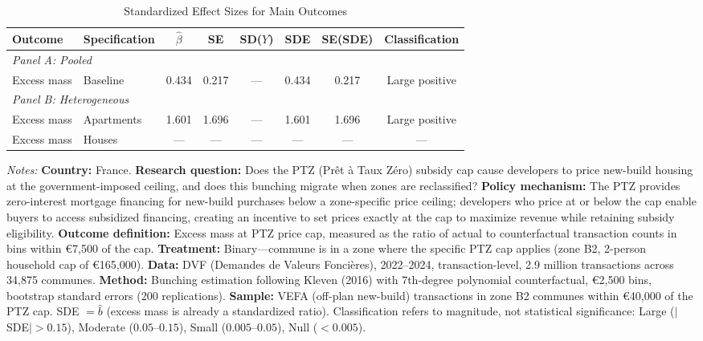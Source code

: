 \begin{table}[H]
\centering
\caption{Standardized Effect Sizes for Main Outcomes}
\label{tab:sde}
\begin{tabular}{llcccccc}
\toprule
Outcome & Specification & $\hat{\beta}$ & SE & SD($Y$) & SDE & SE(SDE) & Classification \\
\midrule
\multicolumn{8}{l}{\textit{Panel A: Pooled}} \\
Excess mass & Baseline & 0.434 & 0.217 & --- & 0.434 & 0.217 & Large positive \\
\midrule
\multicolumn{8}{l}{\textit{Panel B: Heterogeneous}} \\
Excess mass & Apartments & 1.601 & 1.696 & --- & 1.601 & 1.696 & Large positive \\
Excess mass & Houses & --- & --- & --- & --- & --- & --- \\
\bottomrule
\end{tabular}
\par\vspace{0.3em}
{\footnotesize \item \textit{Notes:} \textbf{Country:} France. \textbf{Research question:} Does the PTZ (Pr\^{e}t \`{a} Taux Z\'{e}ro) subsidy cap cause developers to price new-build housing at the government-imposed ceiling, and does this bunching migrate when zones are reclassified? \textbf{Policy mechanism:} The PTZ provides zero-interest mortgage financing for new-build purchases below a zone-specific price ceiling; developers who price at or below the cap enable buyers to access subsidized financing, creating an incentive to set prices exactly at the cap to maximize revenue while retaining subsidy eligibility. \textbf{Outcome definition:} Excess mass at PTZ price cap, measured as the ratio of actual to counterfactual transaction counts in bins within \euro7,500 of the cap. \textbf{Treatment:} Binary---commune is in a zone where the specific PTZ cap applies (zone B2, 2-person household cap of \euro165,000). \textbf{Data:} DVF (Demandes de Valeurs Fonci\`{e}res), 2022--2024, transaction-level, 2.9 million transactions across 34,875 communes. \textbf{Method:} Bunching estimation following Kleven (2016) with 7th-degree polynomial counterfactual, \euro2,500 bins, bootstrap standard errors (200 replications). \textbf{Sample:} VEFA (off-plan new-build) transactions in zone B2 communes within \euro40,000 of the PTZ cap. SDE $= \hat{b}$ (excess mass is already a standardized ratio). Classification refers to magnitude, not statistical significance: Large ($|$SDE$| > 0.15$), Moderate ($0.05$--$0.15$), Small ($0.005$--$0.05$), Null ($< 0.005$).}
\end{table}
